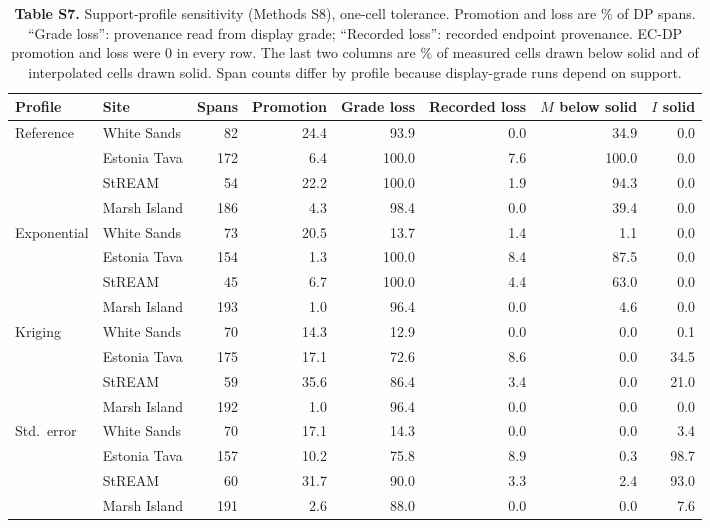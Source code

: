 \documentclass[11pt]{article}
\begin{document}
\begin{table}[!htbp]
\centering
\caption*{\textbf{Table S7.} Support-profile sensitivity (Methods S8), one-cell tolerance. Promotion and loss are \% of DP spans. ``Grade loss'': provenance read from display grade; ``Recorded loss'': recorded endpoint provenance. EC-DP promotion and loss were 0 in every row. The last two columns are \% of measured cells drawn below solid and of interpolated cells drawn solid. Span counts differ by profile because display-grade runs depend on support.}
\vspace{2mm}
\scriptsize
\setlength{\tabcolsep}{4pt}
\begin{tabular}{@{}llrrrrrr@{}}
\toprule
Profile & Site & Spans & Promotion & Grade loss & Recorded loss & $M$ below solid & $I$ solid \\
\midrule
Reference & White Sands & 82 & 24.4 & 93.9 & 0.0 & 34.9 & 0.0 \\
 & Estonia Tava & 172 & 6.4 & 100.0 & 7.6 & 100.0 & 0.0 \\
 & StREAM & 54 & 22.2 & 100.0 & 1.9 & 94.3 & 0.0 \\
 & Marsh Island & 186 & 4.3 & 98.4 & 0.0 & 39.4 & 0.0 \\
Exponential & White Sands & 73 & 20.5 & 13.7 & 1.4 & 1.1 & 0.0 \\
 & Estonia Tava & 154 & 1.3 & 100.0 & 8.4 & 87.5 & 0.0 \\
 & StREAM & 45 & 6.7 & 100.0 & 4.4 & 63.0 & 0.0 \\
 & Marsh Island & 193 & 1.0 & 96.4 & 0.0 & 4.6 & 0.0 \\
Kriging & White Sands & 70 & 14.3 & 12.9 & 0.0 & 0.0 & 0.1 \\
 & Estonia Tava & 175 & 17.1 & 72.6 & 8.6 & 0.0 & 34.5 \\
 & StREAM & 59 & 35.6 & 86.4 & 3.4 & 0.0 & 21.0 \\
 & Marsh Island & 192 & 1.0 & 96.4 & 0.0 & 0.0 & 0.0 \\
Std.\ error & White Sands & 70 & 17.1 & 14.3 & 0.0 & 0.0 & 3.4 \\
 & Estonia Tava & 157 & 10.2 & 75.8 & 8.9 & 0.3 & 98.7 \\
 & StREAM & 60 & 31.7 & 90.0 & 3.3 & 2.4 & 93.0 \\
 & Marsh Island & 191 & 2.6 & 88.0 & 0.0 & 0.0 & 7.6 \\
\bottomrule
\end{tabular}
\end{table}
\end{document}
